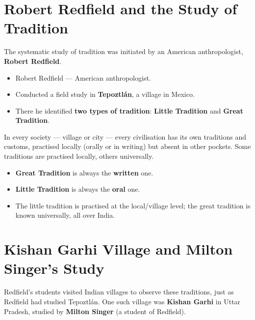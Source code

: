 \section{Robert Redfield and the Study of Tradition}

The systematic study of tradition was initiated by an American anthropologist, \textbf{Robert Redfield}.

\begin{DataFact}
\begin{itemize}
\item Robert Redfield --- American anthropologist.
\item Conducted a field study in \textbf{Tepoztlán}, a village in Mexico.
\item There he identified \textbf{two types of tradition}: \textbf{Little Tradition} and \textbf{Great Tradition}.
\end{itemize}
\end{DataFact}

In every society --- village or city --- every civilisation has its own traditions and customs, practised locally (orally or in writing) but absent in other pockets. Some traditions are practised locally, others universally.

\begin{KeyConcept}
\begin{itemize}
\item \textbf{Great Tradition} is always the \textbf{written} one.
\item \textbf{Little Tradition} is always the \textbf{oral} one.
\item The little tradition is practised at the local/village level; the great tradition is known universally, all over India.
\end{itemize}
\end{KeyConcept}

\section{Kishan Garhi Village and Milton Singer's Study}

Redfield's students visited Indian villages to observe these traditions, just as Redfield had studied Tepoztlán. One such village was \textbf{Kishan Garhi} in Uttar Pradesh, studied by \textbf{Milton Singer} (a student of Redfield).

